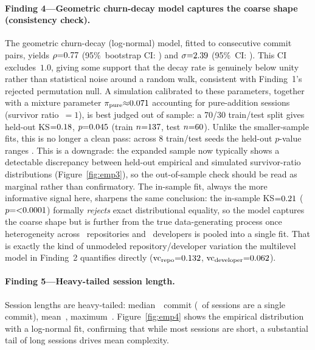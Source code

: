\paragraph{Finding 4---Geometric churn-decay model captures the coarse shape (consistency check).} The geometric churn-decay (log-normal) model, fitted to consecutive commit pairs, yields $\rho{=}0.77$ (95\%~bootstrap CI: \statPCRhoCI) and $\sigma{=}2.39$ (95\%~CI: \statPCSigmaCI). This CI excludes~$1.0$, giving some support that the decay rate is genuinely below unity rather than statistical noise around a random walk, consistent with Finding~1's rejected permutation null. A simulation calibrated to these parameters, together with a mixture parameter $\pi_{\mathrm{pure}}{\approx}0.071$ accounting for pure-addition sessions (survivor ratio~$=1$), is best judged out of sample: a 70/30 train/test split gives held-out KS${=}0.18$, $p{=}0.045$ (train $n{=}137$, test $n{=}60$). Unlike the smaller-sample fits, this is no longer a clean pass: across 8 train/test seeds the held-out $p$-value ranges \statPCKSHeldoutSeedRange. This is a downgrade: the expanded sample now typically shows a detectable discrepancy between held-out empirical and simulated survivor-ratio distributions (Figure~\ref{fig:emp3}), so the out-of-sample check should be read as marginal rather than confirmatory. The in-sample fit, always the more informative signal here, sharpens the same conclusion: the in-sample KS${=}0.21$ ($p{=}{<}0.0001$) formally \emph{rejects} exact distributional equality, so the model captures the coarse shape but is further from the true data-generating process once heterogeneity across \statPCRepos\ repositories and \statPCDevelopers\ developers is pooled into a single fit. That is exactly the kind of unmodeled repository/developer variation the multilevel model in Finding~2 quantifies directly ($\text{vc}_{\mathrm{repo}}{=}0.132$, $\text{vc}_{\mathrm{developer}}{=}0.062$).

\paragraph{Finding 5---Heavy-tailed session length.} Session lengths are heavy-tailed: median~\statPCMedianLen\ commit (\statPCSingleCommitPct\ of sessions are a single commit), mean~\statPCMeanLen, maximum~\statPCMaxLen. Figure~\ref{fig:emp4} shows the empirical distribution with a log-normal fit, confirming that while most sessions are short, a substantial tail of long sessions drives mean complexity.


